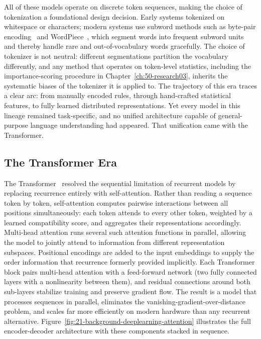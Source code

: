 \begin{foldable}
  All of these models operate on discrete token sequences, making the choice of tokenization a foundational design decision.
  Early systems tokenized on whitespace or characters; modern systems use subword methods such as byte-pair encoding~\cite{sennrich2016neural} and WordPiece~\cite{wu2016google}, which segment words into frequent subword units and thereby handle rare and out-of-vocabulary words gracefully.
  The choice of tokenizer is not neutral: different segmentations partition the vocabulary differently, and any method that operates on token-level statistics, including the importance-scoring procedure in Chapter~\ref{ch:50-research03}, inherits the systematic biases of the tokenizer it is applied to.
  The trajectory of this era traces a clear arc: from manually encoded rules, through hand-crafted statistical features, to fully learned distributed representations. Yet every model in this lineage remained task-specific, and no unified architecture capable of general-purpose language understanding had appeared.
  That unification came with the Transformer.
\end{foldable}

\subsection{The Transformer Era} \label{sec:21-background-deeplearning-transformer}
\begin{foldable}
  The Transformer~\cite{vaswani2017attention} resolved the sequential limitation of recurrent models by replacing recurrence entirely with self-attention.
  Rather than reading a sequence token by token, self-attention computes pairwise interactions between all positions simultaneously: each token attends to every other token, weighted by a learned compatibility score, and aggregates their representations accordingly.
  Multi-head attention runs several such attention functions in parallel, allowing the model to jointly attend to information from different representation subspaces.
  Positional encodings are added to the input embeddings to supply the order information that recurrence formerly provided implicitly.
  Each Transformer block pairs multi-head attention with a feed-forward network (two fully connected layers with a nonlinearity between them), and residual connections around both sub-layers stabilize training and preserve gradient flow.
  The result is a model that processes sequences in parallel, eliminates the vanishing-gradient-over-distance problem, and scales far more efficiently on modern hardware than any recurrent alternative.
  Figure~\ref{fig:21-background-deeplearning-attention} illustrates the full encoder-decoder architecture with these components stacked in sequence.
\end{foldable}

